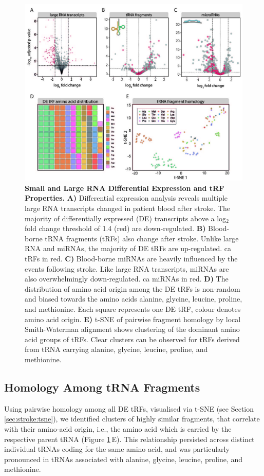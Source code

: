 \begin{figure}[ht]
\includegraphics[width=\textwidth]{figures/stroke-de-tsne}
\caption[Small and Large RNA Differential Expression and tRF Properties.]{\textbf{Small and Large RNA Differential Expression and tRF Properties.} \textbf{A)} Differential expression analysis reveals multiple large RNA transcripts changed in patient blood after stroke. The majority of differentially expressed (DE) transcripts above a log$_2$ fold change threshold of 1.4 (red) are down-regulated. \textbf{B)} Blood-borne tRNA fragments (tRFs) also change after stroke. Unlike large RNA and miRNAs, the majority of DE tRFs are up-regulated. \Acf{ca} tRFs in red. \textbf{C)} Blood-borne miRNAs are heavily influenced by the events following stroke. Like large RNA transcripts, miRNAs are also overwhelmingly down-regulated. \Ac{ca} miRNAs in red. \textbf{D)} The distribution of amino acid origin among the DE tRFs is non-random and biased towards the amino acids alanine, glycine, leucine, proline, and methionine. Each square represents one DE tRF, colour denotes amino acid origin. \textbf{E)} t-SNE of pairwise fragment homology by local Smith-Waterman alignment shows clustering of the dominant amino acid groups of tRFs. Clear clusters can be observed for tRFs derived from tRNA carrying alanine, glycine, leucine, proline, and methionine.
\label{fig:stroke-de-tsne}}
\end{figure}

\subsection{Homology Among tRNA Fragments}
Using pairwise homology among all DE tRFs, visualised via t-SNE (see Section \ref{sec:stroke:tsne}), we identified clusters of highly similar fragments, that correlate with their amino-acid origin, i.e., the amino acid which is carried by the respective parent tRNA (Figure \ref{fig:stroke-de-tsne}\,E). This relationship persisted across distinct individual tRNAs coding for the same amino acid, and was particularly pronounced in tRNAs associated with alanine, glycine, leucine, proline, and methionine.

